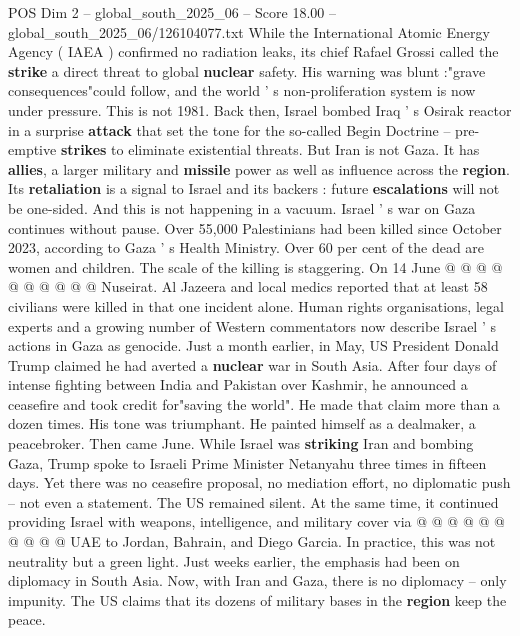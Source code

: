 \begin{textsample}{POS Dim 2 – global\_south\_2025\_06 – Score 18.00 – global\_south\_2025\_06/126104077.txt}  \label{ex:f2_pos_250}
While the International Atomic Energy Agency ( IAEA ) confirmed no radiation leaks, its chief Rafael Grossi called the \textbf{strike} a direct threat to global \textbf{nuclear} safety.
His warning was blunt :"grave consequences"could follow, and the world ' s non-proliferation system is now under pressure.
This is not 1981.
Back then, Israel bombed Iraq ' s Osirak reactor in a surprise \textbf{attack} that set the tone for the so-called Begin Doctrine -- pre-emptive \textbf{strikes} to eliminate existential threats.
But Iran is not Gaza.
It has \textbf{allies}, a larger military and \textbf{missile} power as well as influence across the \textbf{region}.
Its \textbf{retaliation} is a signal to Israel and its backers : future \textbf{escalations} will not be one-sided.
And this is not happening in a vacuum.
Israel ' s war on Gaza continues without pause.
Over 55,000 Palestinians had been killed since October 2023, according to Gaza ' s Health Ministry.
Over 60 per cent of the dead are women and children.
The scale of the killing is staggering.
On 14 June @ @ @ @ @ @ @ @ @ @ Nuseirat.
Al Jazeera and local medics reported that at least 58 civilians were killed in that one incident alone.
Human rights organisations, legal experts and a growing number of Western commentators now describe Israel ' s actions in Gaza as genocide.
Just a month earlier, in May, US President Donald Trump claimed he had averted a \textbf{nuclear} war in South Asia.
After four days of intense fighting between India and Pakistan over Kashmir, he announced a ceasefire and took credit for"saving the world".
He made that claim more than a dozen times.
His tone was triumphant.
He painted himself as a dealmaker, a peacebroker.
Then came June.
While Israel was \textbf{striking} Iran and bombing Gaza, Trump spoke to Israeli Prime Minister Netanyahu three times in fifteen days.
Yet there was no ceasefire proposal, no mediation effort, no diplomatic push -- not even a statement.
The US remained silent.
At the same time, it continued providing Israel with weapons, intelligence, and military cover via @ @ @ @ @ @ @ @ @ @ UAE to Jordan, Bahrain, and Diego Garcia.
In practice, this was not neutrality but a green light.
Just weeks earlier, the emphasis had been on diplomacy in South Asia.
Now, with Iran and Gaza, there is no diplomacy -- only impunity.
The US claims that its dozens of military bases in the \textbf{region} keep the peace.

\end{textsample}
